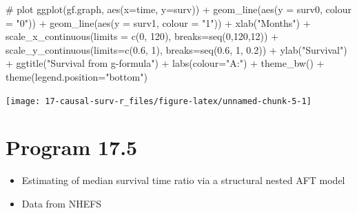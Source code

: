 \documentclass[
  10pt,
  a4paper,
]{book}
\newenvironment{Shaded}{\begin{snugshade}}{\end{snugshade}}
\newcommand{\AttributeTok}[1]{\textcolor[rgb]{0.40,0.45,0.13}{#1}}
\newcommand{\CommentTok}[1]{\textcolor[rgb]{0.37,0.37,0.37}{#1}}
\newcommand{\DecValTok}[1]{\textcolor[rgb]{0.68,0.00,0.00}{#1}}
\newcommand{\FloatTok}[1]{\textcolor[rgb]{0.68,0.00,0.00}{#1}}
\newcommand{\FunctionTok}[1]{\textcolor[rgb]{0.28,0.35,0.67}{#1}}
\newcommand{\NormalTok}[1]{\textcolor[rgb]{0.00,0.46,0.62}{#1}}
\newcommand{\SpecialCharTok}[1]{\textcolor[rgb]{0.37,0.37,0.37}{#1}}
\newcommand{\StringTok}[1]{\textcolor[rgb]{0.13,0.47,0.30}{#1}}
\providecommand{\tightlist}{%
  \setlength{\itemsep}{0pt}\setlength{\parskip}{0pt}}
\begin{document}
\begin{Shaded}
\begin{Highlighting}[]
\CommentTok{\# plot}
\FunctionTok{ggplot}\NormalTok{(gf.graph, }\FunctionTok{aes}\NormalTok{(}\AttributeTok{x=}\NormalTok{time, }\AttributeTok{y=}\NormalTok{surv)) }\SpecialCharTok{+}
  \FunctionTok{geom\_line}\NormalTok{(}\FunctionTok{aes}\NormalTok{(}\AttributeTok{y =}\NormalTok{ surv0, }\AttributeTok{colour =} \StringTok{"0"}\NormalTok{)) }\SpecialCharTok{+}
  \FunctionTok{geom\_line}\NormalTok{(}\FunctionTok{aes}\NormalTok{(}\AttributeTok{y =}\NormalTok{ surv1, }\AttributeTok{colour =} \StringTok{"1"}\NormalTok{)) }\SpecialCharTok{+}
  \FunctionTok{xlab}\NormalTok{(}\StringTok{"Months"}\NormalTok{) }\SpecialCharTok{+}
  \FunctionTok{scale\_x\_continuous}\NormalTok{(}\AttributeTok{limits =} \FunctionTok{c}\NormalTok{(}\DecValTok{0}\NormalTok{, }\DecValTok{120}\NormalTok{), }\AttributeTok{breaks=}\FunctionTok{seq}\NormalTok{(}\DecValTok{0}\NormalTok{,}\DecValTok{120}\NormalTok{,}\DecValTok{12}\NormalTok{)) }\SpecialCharTok{+}
  \FunctionTok{scale\_y\_continuous}\NormalTok{(}\AttributeTok{limits=}\FunctionTok{c}\NormalTok{(}\FloatTok{0.6}\NormalTok{, }\DecValTok{1}\NormalTok{), }\AttributeTok{breaks=}\FunctionTok{seq}\NormalTok{(}\FloatTok{0.6}\NormalTok{, }\DecValTok{1}\NormalTok{, }\FloatTok{0.2}\NormalTok{)) }\SpecialCharTok{+}
  \FunctionTok{ylab}\NormalTok{(}\StringTok{"Survival"}\NormalTok{) }\SpecialCharTok{+}
  \FunctionTok{ggtitle}\NormalTok{(}\StringTok{"Survival from g{-}formula"}\NormalTok{) }\SpecialCharTok{+}
  \FunctionTok{labs}\NormalTok{(}\AttributeTok{colour=}\StringTok{"A:"}\NormalTok{) }\SpecialCharTok{+}
  \FunctionTok{theme\_bw}\NormalTok{() }\SpecialCharTok{+}
  \FunctionTok{theme}\NormalTok{(}\AttributeTok{legend.position=}\StringTok{"bottom"}\NormalTok{)}
\end{Highlighting}
\end{Shaded}

\begin{center}\texttt{[image: 17-causal-surv-r\_files/figure-latex/unnamed-chunk-5-1]} \end{center}

\section{Program 17.5}\label{program-17.5}

\begin{itemize}
\tightlist
\item
  Estimating of median survival time ratio via a structural nested AFT model
\item
  Data from NHEFS
\end{itemize}
\end{document}
